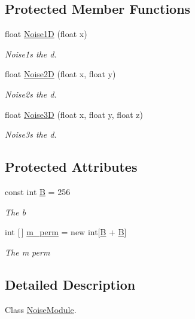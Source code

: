 \subsection*{Protected Member Functions}
\begin{DoxyCompactItemize}
\item 
float \hyperlink{class_noise_module_a2bc5a6d90d2eb98c784049b2ed22d8f9}{Noise1D} (float x)
\begin{DoxyCompactList}\small\item\em Noise1s the d. \end{DoxyCompactList}\item 
float \hyperlink{class_noise_module_ae937ab94facd72d00bd6c226804010d1}{Noise2D} (float x, float y)
\begin{DoxyCompactList}\small\item\em Noise2s the d. \end{DoxyCompactList}\item 
float \hyperlink{class_noise_module_aaf19713b7b0fb83b7561a0a6f9a23cf9}{Noise3D} (float x, float y, float z)
\begin{DoxyCompactList}\small\item\em Noise3s the d. \end{DoxyCompactList}\end{DoxyCompactItemize}
\subsection*{Protected Attributes}
\begin{DoxyCompactItemize}
\item 
const int \hyperlink{class_noise_module_a2dba0071f6e03f54d2cf67d71d978955}{B} = 256
\begin{DoxyCompactList}\small\item\em The b \end{DoxyCompactList}\item 
int \mbox{[}$\,$\mbox{]} \hyperlink{class_noise_module_a3022dc862ba96b45e5ddcb7bcd2ddc09}{m\+\_\+perm} = new int\mbox{[}\hyperlink{class_noise_module_a2dba0071f6e03f54d2cf67d71d978955}{B} + \hyperlink{class_noise_module_a2dba0071f6e03f54d2cf67d71d978955}{B}\mbox{]}
\begin{DoxyCompactList}\small\item\em The m perm \end{DoxyCompactList}\end{DoxyCompactItemize}


\subsection{Detailed Description}
Class \hyperlink{class_noise_module}{Noise\+Module}. 



